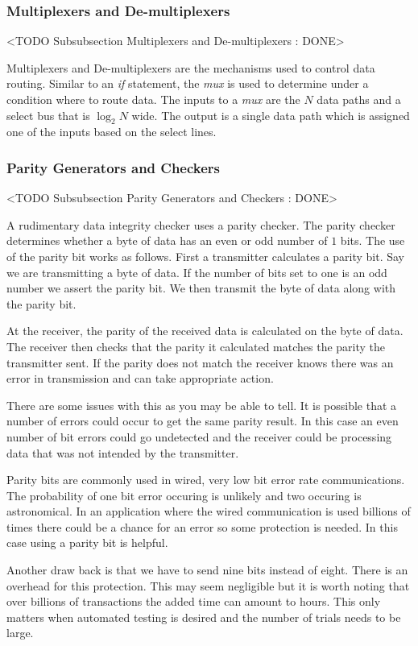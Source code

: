 \subsubsection{Multiplexers and De-multiplexers}
	<TODO Subsubsection  Multiplexers and De-multiplexers : DONE>
	
Multiplexers and De-multiplexers are the mechanisms used to control data routing. Similar to an \emph{if} statement, the \emph{mux} is used to determine under a condition where to route data. The inputs to a \emph{mux} are the $N$ data paths and a select bus that is $\log_{2}N$ wide. The output is a single data path which is assigned one of the inputs based on the select lines. 

\subsubsection{Parity Generators and Checkers}
	<TODO Subsubsection  Parity Generators and Checkers : DONE>
	
A rudimentary data integrity checker uses a parity checker. The parity checker determines whether a byte of data has an even or odd number of $1$ bits. The use of the parity bit works as follows. First a transmitter calculates a parity bit. Say we are transmitting a byte of data. If the number of bits set to one is an odd number we assert the parity bit. We then transmit the byte of data along with the parity bit. 

At the receiver, the parity of the received data is calculated on the byte of data. The receiver then checks that the parity it calculated matches the parity the transmitter sent. If the parity does not match the receiver knows there was an error in transmission and can take appropriate action.

There are some issues with this as you may be able to tell. It is possible that a number of errors could occur to get the same parity result. In this case an even number of bit errors could go undetected and the receiver could be processing data that was not intended by the transmitter. 

Parity bits are commonly used in wired, very low bit error rate communications. The probability of one bit error occuring is unlikely and two occuring is astronomical. In an application where the wired communication is used billions of times there could be a chance for an error so some protection is needed. In this case using a parity bit is helpful. 

Another draw back is that we have to send nine bits instead of eight. There is an overhead for this protection. This may seem negligible but it is worth noting that over billions of transactions the added time can amount to hours. This only matters when automated testing is desired and the number of trials needs to be large. 

